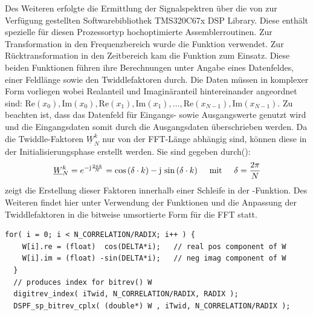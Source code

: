 Des Weiteren erfolgte die Ermittlung der Signalspektren über die von \ti zur Verfügung gestellten Softwarebibliothek TMS320C67x DSP Library\cite{Manual_dsp_lib}. Diese enthält spezielle für diesen Prozessortyp hochoptimierte Assemblerroutinen. Zur Transformation in den Frequenzbereich wurde die Funktion  \cite[S. 4-13]{Manual_dsp_lib} verwendet. Zur Rücktransformation in den Zeitbereich kam die Funktion  \cite[S. 4-34]{Manual_dsp_lib} zum Einsatz. Diese beiden Funktionen führen ihre Berechnungen unter Angabe eines Datenfeldes, einer Feldlänge sowie den Twiddlefaktoren durch. 
Die Daten müssen in komplexer Form vorliegen wobei Realanteil und Imaginäranteil hintereinander angeordnet sind: $\mathrm{Re}(x_0), \mathrm{Im}(x_0), \mathrm{Re}(x_1), \mathrm{Im}(x_1), \dots, \mathrm{Re}(x_{N-1}), \mathrm{Im}(x_{N-1})$. Zu beachten ist, dass das Datenfeld für Eingangs- sowie Ausgangswerte genutzt wird und die Eingangsdaten somit durch die Ausgangsdaten überschrieben werden. Da die Twiddle-Faktoren $\underline{W}^k_N$ nur von der FFT-Länge abhängig sind, können diese in der Initialisierungsphase erstellt werden. Sie sind gegeben durch(\vgl \cite[S. 2]{Slide_Sauvagerd_FFT}): 
\begin{equation}
    \underline{W}^k_N = e^{-\im\frac{2 \pi k}{N}} = \cos{\left(\delta \cdot k\right)} - \im \, \sin{\left(\delta \cdot k\right)} \eqspace \text{mit} \eqspace  \delta = \frac{2 \pi}{N}     
\end{equation}
 zeigt die Erstellung dieser Faktoren innerhalb einer Schleife in der -Funktion. Des Weiteren findet hier unter Verwendung der Funktionen  und  die Anpassung der Twiddlefaktoren in die bitweise umsortierte Form für die FFT statt.

\pagebreak

\begin{lstlisting}[caption={Erstellung der Twiddlefaktoren innhalb einer Schleife in der \code{init()}-Funktion.}, label=lst:twiddleFaktoren,frame=htlrb, firstnumber=1]
  for( i = 0; i < N_CORRELATION/RADIX; i++ ) {
    W[i].re = (float)  cos(DELTA*i);   // real pos component of W
    W[i].im = (float) -sin(DELTA*i);   // neg imag component of W
  }
  // produces index for bitrev() W
  digitrev_index( iTwid, N_CORRELATION/RADIX, RADIX );  
  DSPF_sp_bitrev_cplx( (double*) W , iTwid, N_CORRELATION/RADIX );
\end{lstlisting}



